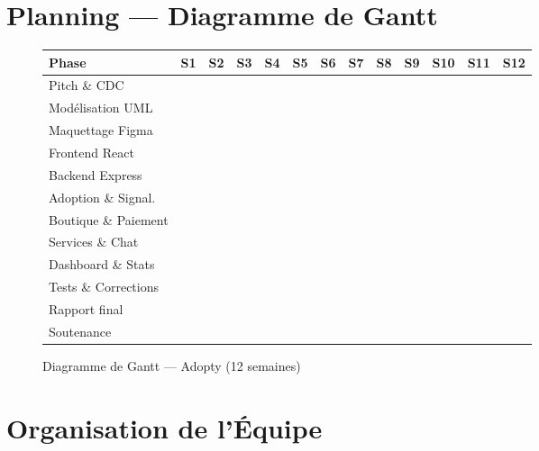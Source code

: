 \documentclass[12pt,a4paper]{report}
\begin{document}
\section{Planning --- Diagramme de Gantt}

\begin{figure}[H]
\centering
\small
\setlength{\tabcolsep}{2.5pt}
\begin{tabular}{@{}p{3.5cm}*{12}{C{0.52cm}}@{}}
\toprule
\textbf{Phase} & \textbf{S1} & \textbf{S2} & \textbf{S3} & \textbf{S4} & \textbf{S5} & \textbf{S6} & \textbf{S7} & \textbf{S8} & \textbf{S9} & \textbf{S10} & \textbf{S11} & \textbf{S12} \\
\midrule
Pitch \& CDC          &  &  & & & & & & & & & & \\
Modélisation UML      & & &  &  & & & & & & & & \\
Maquettage Figma      & & &  &  & & & & & & & & \\
Frontend React        & & & & &  &  &  & & & & & \\
Backend Express       & & & & &  &  &  & & & & & \\
Adoption \& Signal.   & & & & & & &  &  & & & & \\
Boutique \& Paiement  & & & & & & & &  &  & & & \\
Services \& Chat      & & & & & & & & &  &  & & \\
Dashboard \& Stats    & & & & & & & & & &  &  & \\
Tests \& Corrections  & & & & & & & & & & &  &  \\
Rapport final         & & & & & & & & & & &  &  \\
Soutenance            & & & & & & & & & & & &  \\
\bottomrule
\end{tabular}
\caption{Diagramme de Gantt --- Adopty (12 semaines)}
\label{fig:gantt}
\end{figure}

\section{Organisation de l'Équipe}
\end{document}
